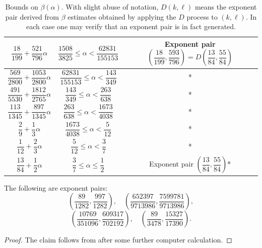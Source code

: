 \documentclass[a4paper, 10pt]{amsart}
\begin{document}
\begin{table}[ht]
{\begin{tabular}{|c|c|c|}
    \hline
    $\dfrac{18}{199} + \dfrac{521}{796}\alpha$ & $\dfrac{1508}{3825}\leq \alpha < \dfrac{62831}{155153}$ & Exponent pair $\left(\dfrac{18}{199}, \dfrac{593}{796}\right) = D\left(\dfrac{13}{84}, \dfrac{55}{84}\right)$\\
    \hline
    $\dfrac{569}{2800} + \dfrac{1053}{2800}\alpha$ & $\dfrac{62831}{155153}\leq \alpha < \dfrac{143}{349}$ & \cite[Table 19.2]{huxley_area_1996}*\\
    \hline
    $\dfrac{491}{5530} + \dfrac{1812}{2765}\alpha $ & $\dfrac{143}{349}\le\alpha < \dfrac{263}{638}$ & \cite[Table 19.2]{huxley_area_1996}*\\
    \hline
    $\dfrac{113}{1345} + \dfrac{897}{1345}\alpha $ & $ \dfrac{263}{638} \le\alpha < \dfrac{1673}{4038}$ & \cite[Table 19.2]{huxley_area_1996}*\\
    \hline
    $\dfrac{2}{9} + \dfrac{1}{3} \alpha $ & $ \dfrac{1673}{4038} \le\alpha < \dfrac{5}{12}$ & \cite[(3.18)]{bourgain_decoupling_2017}* \\
    \hline
    $\dfrac{1}{12} + \dfrac{2}{3}\alpha$ & $\dfrac{5}{12}\leq \alpha < \dfrac{3}{7}$ & \cite[(3.18)]{bourgain_decoupling_2017}* \\
    \hline
    $\dfrac{13}{84} + \dfrac{1}{2}\alpha$ & $\dfrac{3}{7}\leq \alpha \leq \dfrac{1}{2}$ & Exponent pair $\left(\dfrac{13}{84}, \dfrac{55}{84}\right)$* \\
    \hline
    \end{tabular}
    }
    \caption{Bounds on $\beta(\alpha)$. With slight abuse of notation, $D(k, \ell)$ means the exponent pair derived from $\beta$ estimates obtained by applying the $D$ process to $(k, \ell)$. In each case one may verify that an exponent pair is in fact generated.}
    \label{beta-table}
\end{table}


\begin{theorem}\label{new-exp-pair} The following are exponent pairs:
\[
\left(\frac{89}{1282}, \frac{997}{1282}\right),\quad \left(\frac{652397}{9713986}, \frac{7599781}{9713986}\right),
\]
\[
\left(\frac{10769}{351096}, \frac{609317}{702192}\right),\quad \left(\frac{89}{3478}, \frac{15327}{17390}\right).
\]
\end{theorem}

\begin{proof} The claim follows from  after some further computer calculation.
\end{proof}
\end{document}
